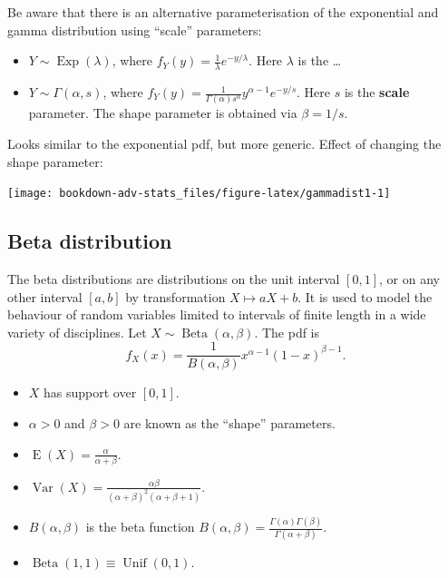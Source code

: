 \documentclass[
]{book}
\providecommand{\tightlist}{%
  \setlength{\itemsep}{0pt}\setlength{\parskip}{0pt}}
\DeclareMathOperator{\E}{E}
\DeclareMathOperator{\Var}{Var}
\DeclareMathOperator{\Exp}{Exp}
\DeclareMathOperator{\Betadist}{Beta}
\DeclareMathOperator{\Unif}{Unif}
\theoremstyle{definition}
\theoremstyle{definition}
\theoremstyle{definition}
\theoremstyle{definition}
\theoremstyle{remark}
\begin{document}
Be aware that there is an alternative parameterisation of the exponential and gamma distribution using ``scale'' parameters:

\begin{itemize}
\tightlist
\item
  \(Y \sim \Exp(\lambda)\), where \(f_Y(y)=\frac{1}{\lambda}e^{-y/\lambda}\). Here \(\lambda\) is the \ldots{}
\item
  \(Y \sim \Gamma(\alpha,s)\), where \(f_Y(y)=\frac{1}{\Gamma(\alpha)s^\alpha} y^{\alpha-1} e^{-y/s}\). Here \(s\) is the \textbf{scale} parameter. The shape parameter is obtained via \(\beta=1/s\).
\end{itemize}

Looks similar to the exponential pdf, but more generic.
Effect of changing the shape parameter:

\begin{center}\texttt{[image: bookdown-adv-stats\_files/figure-latex/gammadist1-1]} \end{center}

\hypertarget{beta-distribution}{%
\subsection{Beta distribution}\label{beta-distribution}}

The beta distributions are distributions on the unit interval \([0,1]\), or on any other interval \([a,b]\) by transformation \(X \mapsto aX + b\).
It is used to model the behaviour of random variables limited to intervals of finite length in a wide variety of disciplines.
Let \(X\sim \Betadist(\alpha,\beta)\).
The pdf is
\[
  f_X(x) = \frac{1}{B(\alpha,\beta)} x^{\alpha-1} (1-x)^{\beta-1}.
\]

\begin{itemize}
\tightlist
\item
  \(X\) has support over \([0,1]\).
\item
  \(\alpha>0\) and \(\beta>0\) are known as the ``shape'' parameters.
\item
  \(\E(X)=\frac{\alpha}{\alpha+\beta}\).
\item
  \(\Var(X)=\frac{\alpha\beta}{(\alpha+\beta)^2(\alpha+\beta+1)}\).
\item
  \(B(\alpha,\beta)\) is the beta function \(B(\alpha,\beta) = \frac{\Gamma(\alpha)\Gamma(\beta)}{\Gamma(\alpha+\beta)}\).
\item
  \(\Betadist(1,1)\equiv \Unif(0,1)\).
\end{itemize}
\end{document}
